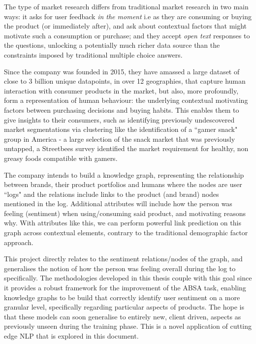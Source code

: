 \documentclass[11pt]{report}
\theoremstyle{Definition}
\theoremstyle{remark}
\begin{document}
The type of market research differs from traditional market research in two main ways: it asks for user feedback \textit{in the moment} i.e as they are consuming or buying the product (or immediately after), and ask about contextual factors that might motivate such a consumption or purchase; and they accept \textit{open text} responses to the questions, unlocking a potentially much richer data source than the constraints imposed by traditional multiple choice answers.

Since the company was founded in 2015, they have amassed a large dataset of close to 3 billion unique datapoints, in over 12 geographies, that capture human interaction with consumer products in the market, but also, more profoundly, form a representation of human behaviour: the underlying contextual motivating factors between purchasing decisions and buying habits. This enables them to give insights to their consumers, such as identifying previously undescovered market segmentations via clustering like the identification of a ``gamer snack" group in America - a large selection of the snack market that was previously untapped, a Streetbees survey identified the market requirement for healthy, non greasy foods compatible with gamers. 

The company intends to build a knowledge graph, representing the relationship between brands, their product portfolios and humans where the nodes are user ``logs" and the relations include links to the product (and brand) nodes mentioned in the log. Additional attributes will include how the person was feeling (sentiment) when using/consuming said product, and motivating reasons why. With attributes like this, we can perform powerful link prediction on this graph across contextual elements, contrary to the traditional demographic factor approach.

This project directly relates to the sentiment relations/nodes of the graph, and generalises the notion of how the person was feeling overall during the log to specifically. The methodologies developed in this thesis couple with this goal since it provides a robust framework for the improvement of the ABSA task, enabling knowledge graphs to be build that correctly identify user sentiment on a more granular level, specifically regarding particular aspects of products. The hope is that these models can soon generalise to entirely new, client driven, aspects as previously unseen during the training phase. This is a novel application of cutting edge NLP that is explored in this document.
\end{document}

